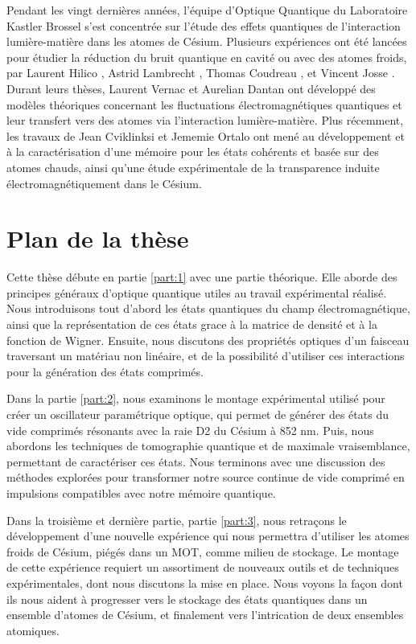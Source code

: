 Pendant les vingt derni\`eres ann\'ees, l'\'equipe d'Optique Quantique du Laboratoire Kastler Brossel s'est concentr\'ee sur l'\'etude des effets quantiques de l'interaction lumi\`ere-mati\`ere dans les atomes de C\'esium. Plusieurs exp\'eriences ont \'et\'e lanc\'ees pour \'etudier la r\'eduction du bruit quantique en cavit\'e ou avec des atomes froids, par Laurent Hilico \cite{HilicoPhD}, Astrid Lambrecht \cite{LambrechtPhD}, Thomas Coudreau \cite{CoudreauPhD}, et Vincent Josse \cite{JossePhD}.  Durant leurs th\`eses, Laurent Vernac \cite{VernacPhD} et Aurelian Dantan \cite{DantanPhD} ont d\'evelopp\'e des mod\`eles th\'eoriques concernant les fluctuations \'electromagn\'etiques quantiques et leur transfert vers des atomes via l'interaction lumi\`ere-mati\`ere. Plus r\'ecemment, les travaux de Jean Cviklinksi \cite{CviklinskiPhD} et Jememie Ortalo  \cite{ortalo} ont men\'e au d\'eveloppement et \`a la caract\'erisation d'une m\'emoire pour les \'etats coh\'erents et bas\'ee sur des atomes chauds, ainsi qu'une \'etude exp\'erimentale de la transparence induite \'electromagn\'etiquement dans le C\'esium.

 

 

\newpage
\section*{Plan de la th\`ese}

Cette th\`ese d\'ebute en partie \ref{part:1} avec une partie th\'eorique. Elle aborde des principes g\'en\'eraux d'optique quantique utiles au travail exp\'erimental r\'ealis\'e. Nous introduisons tout d'abord les \'etats quantiques du champ \'electromagn\'etique, ainsi que la repr\'esentation de ces \'etats grace \`a la matrice de densit\'e et \`a la fonction de Wigner. Ensuite, nous discutons des propri\'et\'es optiques d'un faisceau traversant un mat\'eriau non lin\'eaire, et de la possibilit\'e d'utiliser ces interactions pour la g\'en\'eration des \'etats comprim\'es.

Dans la partie \ref{part:2}, nous examinons le montage exp\'erimental utilis\'e pour cr\'eer un oscillateur param\'etrique optique, qui permet de g\'en\'erer des \'etats du vide comprim\'es r\'esonants avec la raie D2 du C\'esium \`a 852 nm. Puis, nous abordons les techniques de tomographie quantique et de maximale vraisemblance, permettant de caract\'eriser ces \'etats. Nous terminons avec une discussion des m\'ethodes explor\'ees pour transformer notre source continue de vide comprim\'e en impulsions compatibles avec notre m\'emoire quantique.

Dans la troisi\`eme et derni\`ere partie, partie \ref{part:3}, nous retra\c{c}ons le d\'eveloppement d'une nouvelle exp\'erience qui nous permettra d'utiliser les atomes froids de C\'esium, pi\'eg\'es dans un MOT, comme milieu de stockage. Le montage de cette exp\'erience requiert un assortiment de nouveaux outils et de techniques exp\'erimentales, dont nous discutons la mise en place. Nous voyons la fa\c{c}on dont ils nous aident \`a progresser vers le stockage des \'etats quantiques dans un ensemble d'atomes de C\'esium, et finalement vers l'intrication de deux ensembles atomiques.
